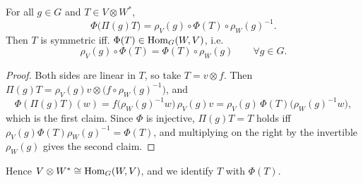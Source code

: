 \begin{lemma}\label{sym:lem:invariant_iff_intertwiner} For all $g\in G$ and
  $T\in V\otimes W^\ast$,
  \[
    \Phi\bigl(\Pi(g)T\bigr)=\rho_V(g)\circ\Phi(T)\circ\rho_W(g)^{-1}.
  \]
  Then $T$ is symmetric iff. $\Phi(T)\in\operatorname{Hom}_G(W,V)$, i.e.
  \[
    \rho_V(g)\circ\Phi(T)=\Phi(T)\circ\rho_W(g)\qquad\forall g\in G.
  \]
\end{lemma}
\begin{proof}
  Both sides are linear in $T$, so take $T=v\otimes f$. Then
  $\Pi(g)T=\rho_V(g)v\otimes\bigl(f\circ\rho_W(g)^{-1}\bigr)$, and
  \[
    \Phi(\Pi(g)T)(w)=f\bigl(\rho_W(g)^{-1}w\bigr)\,\rho_V(g)v
    =\rho_V(g)\,\Phi(T)\bigl(\rho_W(g)^{-1}w\bigr),
  \]
  which is the first claim. Since $\Phi$ is injective, $\Pi(g)T=T$ holds iff
  $\rho_V(g)\Phi(T)\rho_W(g)^{-1}=\Phi(T)$, and multiplying on the right by the
  invertible $\rho_W(g)$ gives the second claim.
\end{proof}

Hence $V\otimes W^\ast \cong\operatorname{Hom}_G(W,V)$, and we identify $T$ with $\Phi(T)$.


